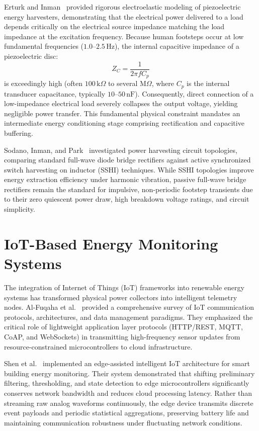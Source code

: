 Erturk and Inman~\cite{erturk2011piezoelectric} provided rigorous electroelastic modeling of piezoelectric energy harvesters, demonstrating that the electrical power delivered to a load depends critically on the electrical source impedance matching the load impedance at the excitation frequency. Because human footsteps occur at low fundamental frequencies ($1.0\text{--}2.5\,\text{Hz}$), the internal capacitive impedance of a piezoelectric disc:
\begin{equation}
Z_C = \frac{1}{2 \pi f C_p}
\label{eq:piezo_impedance}
\end{equation}
is exceedingly high (often $100\,\text{k}\Omega$ to several $\text{M}\Omega$, where $C_p$ is the internal transducer capacitance, typically $10\text{--}50\,\text{nF}$). Consequently, direct connection of a low-impedance electrical load severely collapses the output voltage, yielding negligible power transfer. This fundamental physical constraint mandates an intermediate energy conditioning stage comprising rectification and capacitive buffering.

Sodano, Inman, and Park~\cite{sodano2004estimation} investigated power harvesting circuit topologies, comparing standard full-wave diode bridge rectifiers against active synchronized switch harvesting on inductor (SSHI) techniques. While SSHI topologies improve energy extraction efficiency under harmonic vibration, passive full-wave bridge rectifiers remain the standard for impulsive, non-periodic footstep transients due to their zero quiescent power draw, high breakdown voltage ratings, and circuit simplicity.

\section{IoT-Based Energy Monitoring Systems}
The integration of Internet of Things (IoT) frameworks into renewable energy systems has transformed physical power collectors into intelligent telemetry nodes. Al-Fuqaha et al.~\cite{alfuqaha2015internet} provided a comprehensive survey of IoT communication protocols, architectures, and data management paradigms. They emphasized the critical role of lightweight application layer protocols (HTTP/REST, MQTT, CoAP, and WebSockets) in transmitting high-frequency sensor updates from resource-constrained microcontrollers to cloud infrastructure.

Shen et al.~\cite{shen2018iot} implemented an edge-assisted intelligent IoT architecture for smart building energy monitoring. Their system demonstrated that shifting preliminary filtering, thresholding, and state detection to edge microcontrollers significantly conserves network bandwidth and reduces cloud processing latency. Rather than streaming raw analog waveforms continuously, the edge device transmits discrete event payloads and periodic statistical aggregations, preserving battery life and maintaining communication robustness under fluctuating network conditions.

